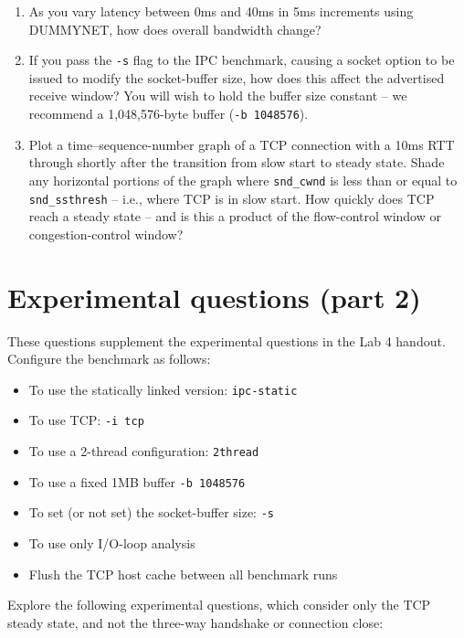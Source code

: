 \documentclass[a4paper,10pt]{article}
\begin{document}
\begin{enumerate}
  \item As you vary latency between 0ms and 40ms in 5ms increments using
    DUMMYNET, how does overall bandwidth change?
  \item If you pass the \texttt{-s} flag to the IPC benchmark, causing a
    socket option to be issued to modify the socket-buffer size, how does
    this affect the advertised receive window?  You will wish to hold the
    buffer size constant -- we recommend a 1,048,576-byte buffer
    (\texttt{-b 1048576}).
  \item Plot a time--sequence-number graph of a TCP connection with a 10ms
    RTT through shortly after the transition from slow start to steady state.
    Shade any horizontal portions of the graph where \texttt{snd\_cwnd} is
    less than or equal to \texttt{snd\_ssthresh} -- i.e., where TCP is in slow
    start.
    How quickly does TCP reach a steady state -- and is this a product of the
    flow-control window or congestion-control window?
\end{enumerate}

\section*{Experimental questions (part 2)}

These questions supplement the experimental questions in the Lab 4 handout.
Configure the benchmark as follows:

\begin{itemize}
\item To use the statically linked version: \texttt{ipc-static}
\item To use TCP: \texttt{-i tcp}
\item To use a 2-thread configuration: \texttt{2thread}
\item To use a fixed 1MB buffer \texttt{-b 1048576}
\item To set (or not set) the socket-buffer size: \texttt{-s}
\item To use only I/O-loop analysis
\item Flush the TCP host cache between all benchmark runs
\end{itemize}

\noindent
Explore the following experimental questions, which consider only the TCP
steady state, and not the three-way handshake or connection close:
\end{document}
